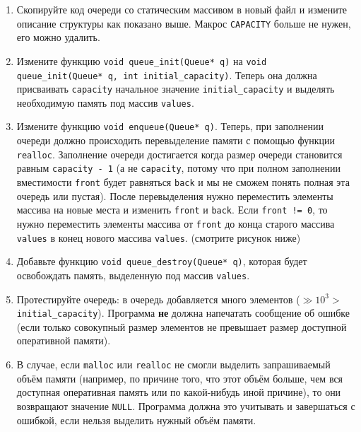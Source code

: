 \documentclass[10pt]{article}
\begin{document}
\begin{enumerate}
\item Скопируйте код очереди со статическим массивом в новый файл и измените описание структуры как показано выше. Макрос \texttt{CAPACITY} больше не нужен, его можно удалить.

\item Измените функцию \texttt{void queue\_init(Queue* q)} на \texttt{void queue\_init(Queue* q, int initial\_capacity)}. Теперь она должна присваивать \texttt{capacity} начальное значение \texttt{initial\_capacity} и выделять необходимую память под массив \texttt{values}.

\item Измените функцию \texttt{void enqueue(Queue* q)}. Теперь, при заполнении очереди должно происходить перевыделение памяти с помощью функции \texttt{realloc}. Заполнение очереди достигается когда размер очереди становится равным \texttt{capacity - 1} (а не \texttt{capacity}, потому что при полном заполнении вместимости \texttt{front} будет равняться \texttt{back} и мы не сможем понять полная эта очередь или пустая).
После перевыделения нужно переместить элементы массива на новые места и изменить \texttt{front} и \texttt{back}. Если \texttt{front != 0}, то нужно переместить элементы массива от \texttt{front} до конца старого массива \texttt{values} в конец нового массива \texttt{values}. (смотрите рисунок ниже)

\item Добавьте функцию \texttt{void queue\_destroy(Queue* q)}, которая будет освобождать память, выделенную под массив \texttt{values}.

\item Протестируйте очередь: в очередь добавляется много элементов ($\gg 10^3 >$ \texttt{initial\_capacity}). Программа \textbf{не} должна напечатать сообщение об ошибке (если только совокупный размер элементов не превышает размер доступной оперативной памяти). 

\item В случае, если \texttt{malloc} или \texttt{realloc} не смогли выделить запрашиваемый объём памяти (например, по причине того, что этот объём  больше, чем вся доступная оперативная память или по какой-нибудь иной причине), то они возвращают значение \texttt{NULL}. Программа должна это учитывать и завершаться с ошибкой, если нельзя выделить нужный объём памяти.
\end{enumerate}
\end{document}
